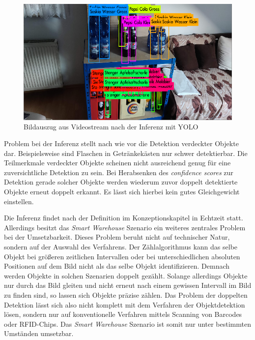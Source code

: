 \begin{figure}[H]
	\begin{center}
		\includegraphics[width=13cm]{Bilder/yolo_inference.png} 
		\caption{Bildauszug aus Videostream nach der Inferenz mit YOLO}
		\label{yolo_inference}
	\end{center}
\end{figure}

Problem bei der Inferenz stellt nach wie vor die Detektion verdeckter Objekte dar. Beispielsweise sind Flaschen in Getränkekästen nur schwer detektierbar. Die Teilmerkmale verdeckter Objekte scheinen nicht ausreichend genug für eine zuversichtliche Detektion zu sein. Bei Herabsenken des \textit{confidence scores} zur Detektion gerade solcher Objekte werden wiederum zuvor doppelt detektierte Objekte erneut doppelt erkannt. Es lässt sich hierbei kein gutes Gleichgewicht einstellen. 

Die Inferenz findet nach der Definition im Konzeptionskapitel in Echtzeit statt. Allerdings besitzt das \textit{Smart Warehouse} Szenario ein weiteres zentrales Problem bei der Umsetzbarkeit. Dieses Problem beruht nicht auf technischer Natur, sondern auf der Auswahl des Verfahrens. Der Zählalgorithmus kann das selbe Objekt bei größeren zeitlichen Intervallen oder bei unterschiedlichen absoluten Positionen auf dem Bild nicht als das selbe Objekt identifizieren. Demnach werden Objekte in solchen Szenarien doppelt gezählt. Solange allerdings Objekte nur durch das Bild \glqq gleiten\grqq{} und nicht erneut nach einem gewissen Intervall im Bild zu finden sind, so lassen sich Objekte präzise zählen. Das Problem der doppelten Detektion lässt sich also nicht komplett mit dem Verfahren der Objektdetektion lösen, sondern nur auf konventionelle Verfahren mittels Scanning von Barcodes oder RFID-Chips. Das \textit{Smart Warehouse} Szenario ist somit nur unter bestimmten Umständen umsetzbar. 
